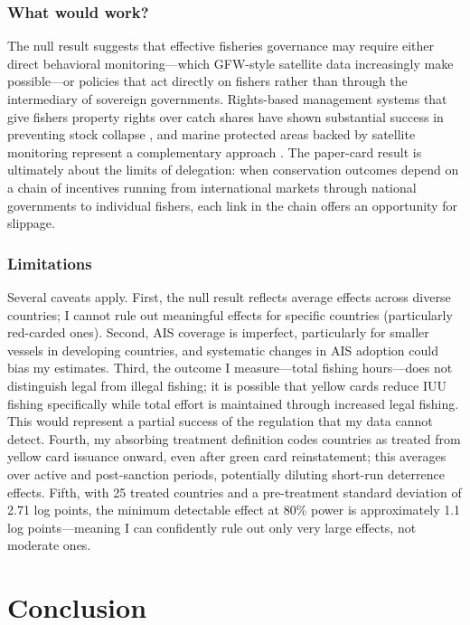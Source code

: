 \documentclass[12pt]{article}
\begin{document}
\subsubsection*{What would work?} The null result suggests that effective fisheries governance may require either direct behavioral monitoring---which GFW-style satellite data increasingly make possible---or policies that act directly on fishers rather than through the intermediary of sovereign governments. Rights-based management systems that give fishers property rights over catch shares have shown substantial success in preventing stock collapse \citep{costello2008can, melnychuk2017fisheries}, and marine protected areas backed by satellite monitoring represent a complementary approach \citep{mcdermott2019blue}. The paper-card result is ultimately about the limits of delegation: when conservation outcomes depend on a chain of incentives running from international markets through national governments to individual fishers, each link in the chain offers an opportunity for slippage.

\subsubsection*{Limitations} Several caveats apply. First, the null result reflects average effects across diverse countries; I cannot rule out meaningful effects for specific countries (particularly red-carded ones). Second, AIS coverage is imperfect, particularly for smaller vessels in developing countries, and systematic changes in AIS adoption could bias my estimates. Third, the outcome I measure---total fishing hours---does not distinguish legal from illegal fishing; it is possible that yellow cards reduce IUU fishing specifically while total effort is maintained through increased legal fishing. This would represent a partial success of the regulation that my data cannot detect. Fourth, my absorbing treatment definition codes countries as treated from yellow card issuance onward, even after green card reinstatement; this averages over active and post-sanction periods, potentially diluting short-run deterrence effects. Fifth, with 25 treated countries and a pre-treatment standard deviation of 2.71 log points, the minimum detectable effect at 80\% power is approximately 1.1 log points---meaning I can confidently rule out only very large effects, not moderate ones.


\section{Conclusion}
\label{sec:conclusion}
\end{document}

